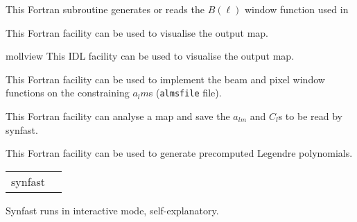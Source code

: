 \begin{support}
  \begin{sulist}{} %
  \item[\htmlref{generate\_beam}{sub:generate_beam}] This \healpix Fortran
subroutine generates or reads the $B(\ell)$ window function used in \thedocid
  \item[\htmlref{map2gif}{fac:map2gif}] This \healpix Fortran facility can be used to visualise the
  output map.
  \item[mollview] This \healpix IDL facility can be used to visualise the
  output map.
  \item[\htmlref{alteralm}{fac:alteralm}] This \healpix Fortran facility can be
  used to implement the beam and pixel window functions on the constraining
  $a_lm$s ({\tt almsfile} file).
  \item[\htmlref{anafast}{fac:anafast}] This \healpix Fortran facility can analyse a \healpix map and 
     	       save the $a_{lm}$ and $C_l$s to be read by synfast.
  \item[\htmlref{plmgen}{fac:plmgen}] This \healpix Fortran facility can be used to generate precomputed Legendre polynomials.
		
  \end{sulist}
\end{support}

\begin{examples}{1}
{
\begin{tabular}{ll} %
synfast  \\
\end{tabular}
}
{
Synfast runs in interactive mode, self-explanatory.
}
\end{examples}

\vfill\newpage

